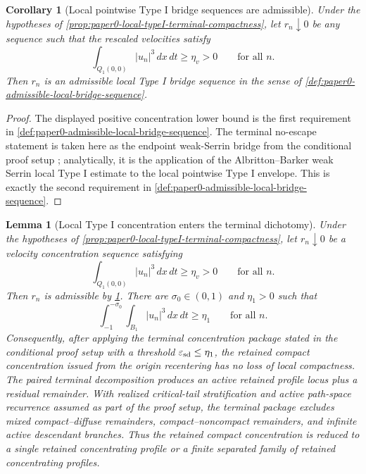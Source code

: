\documentclass[11pt]{amsart}
\theoremstyle{plain}
\newtheorem{lemma}[lemma]{Lemma}
\newtheorem{corollary}[corollary]{Corollary}
\theoremstyle{definition}
\theoremstyle{remark}
\begin{document}
\begin{corollary}[Local pointwise Type I bridge sequences are admissible]
\label{cor:paper0-local-typeI-bridge-admissible}
Under the hypotheses of
\cref{prop:paper0-local-typeI-terminal-compactness}, let \(r_n\downarrow0\) be
any sequence such that the rescaled velocities satisfy
\[
  \int_{Q_1(0,0)} |u_n|^3\,dx\,dt\ge\eta_v>0
  \qquad\text{for all }n .
\]
Then \(r_n\) is an admissible local Type I bridge sequence in the sense of
\cref{def:paper0-admissible-local-bridge-sequence}.
\end{corollary}

\begin{proof}
The displayed positive concentration lower bound is the first requirement in
\cref{def:paper0-admissible-local-bridge-sequence}.  The terminal
no-escape statement is taken here as the endpoint weak-Serrin bridge from the
conditional proof setup \cite{ProofSetupTypeI}; analytically, it is the
application of the Albritton--Barker weak Serrin local Type I estimate
\cite{AlbrittonBarker2019} to the local pointwise Type I envelope.  This is
exactly the second requirement in
\cref{def:paper0-admissible-local-bridge-sequence}.
\end{proof}

\begin{lemma}[Local Type I concentration enters the terminal dichotomy]
\label{lem:paper0-local-typeI-into-terminal-dichotomy}
Under the hypotheses of
\cref{prop:paper0-local-typeI-terminal-compactness}, let \(r_n\downarrow0\) be
a velocity concentration sequence satisfying
\[
  \int_{Q_1(0,0)} |u_n|^3\,dx\,dt\ge\eta_v>0
  \qquad\text{for all }n .
\]
Then \(r_n\) is admissible by
\cref{cor:paper0-local-typeI-bridge-admissible}.  There are
\(\sigma_0\in(0,1)\) and \(\eta_1>0\) such that
\begin{equation}\label{eq:paper0-local-typeI-bridge-away-mass}
  \int_{-1}^{-\sigma_0}\int_{B_1}|u_n|^3\,dx\,dt\ge\eta_1
  \qquad\text{for all }n.
\end{equation}
Consequently, after applying the terminal concentration package stated in the
conditional proof setup \cite{ProofSetupTypeI} with a threshold
\(\varepsilon_{\rm sd}\le\eta_1\), the retained compact concentration issued
from the origin recentering has no loss of local compactness.  The paired
terminal decomposition produces an active retained profile locus plus a
residual remainder.  With realized critical-tail stratification and active
path-space recurrence assumed as part of the proof setup, the terminal package
excludes mixed compact--diffuse remainders,
compact--noncompact remainders, and infinite active descendant branches.  Thus
the retained compact concentration is reduced to a single retained
concentrating profile or a finite separated family of retained concentrating
profiles.
\end{lemma}
\end{document}

